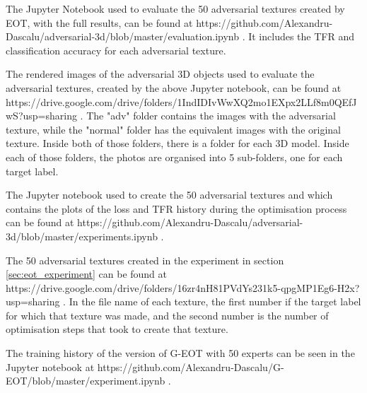 The Jupyter Notebook used to evaluate the 50 adversarial textures created by EOT, with the full results, can be found at https://github.com/Alexandru-Dascalu/adversarial-3d/blob/master/evaluation.ipynb . It includes the TFR and classification accuracy for each adversarial texture. 

The rendered images of the adversarial 3D objects used to evaluate the adversarial textures, created by the above Jupyter notebook, can be found at https://drive.google.com/drive/folders/1IndIDIvWwXQ2mo1EXpx2LLf8m0QEfJwS?usp=sharing . The "adv" folder contains the images with the adversarial texture, while the "normal" folder has the equivalent images with the original texture. Inside both of those folders, there is a folder for each 3D model. Inside each of those folders, the photos are organised into 5 sub-folders, one for each target label.

The Jupyter notebook used to create the 50 adversarial textures and which contains the plots of the loss and TFR history during the optimisation process can be found at https://github.com/Alexandru-Dascalu/adversarial-3d/blob/master/experiments.ipynb .

The 50 adversarial textures created in the experiment in section \ref{sec:eot_experiment} can be found at https://drive.google.com/drive/folders/16zr4nH81PVdYs231k5-qpgMP1Eg6-H2x?usp=sharing . In the file name of each texture, the first number if the target label for which that texture was made, and the second number is the number of optimisation steps that took to create that texture.

The training history of the version of G-EOT with 50 experts can be seen in the Jupyter notebook at https://github.com/Alexandru-Dascalu/G-EOT/blob/master/experiment.ipynb .


